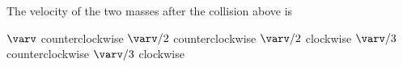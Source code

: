 \documentclass{../../oss-classkick-exam}
\begin{document}
\begin{questions}
\begin{multicols*}{2}
    \question The velocity of the two masses after the collision above is
    \label{moon2}
    \begin{choices}
      \choice $\varv$ counterclockwise
      \choice $\varv/2$ counterclockwise
      \choice $\varv/2$ clockwise
      \choice $\varv/3$ counterclockwise
      \choice $\varv/3$ clockwise
    \end{choices}
    \vspace{.7in}
    
%    
  \end{multicols*}
  \newpage


\end{questions}
\end{document}
